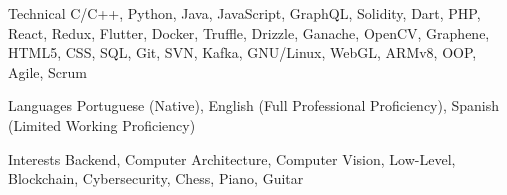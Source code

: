 
\begin{cvskills}
  \cvskill
    {Technical} %
    {C/C++, Python, Java, JavaScript, GraphQL, Solidity, Dart, PHP, React, Redux, Flutter, Docker, Truffle, Drizzle, Ganache, OpenCV, Graphene, HTML5, CSS, SQL, Git, SVN, Kafka, GNU/Linux, WebGL, ARMv8, OOP, Agile, Scrum} %

  \cvskill
    {Languages} %
    {Portuguese (Native), English (Full Professional Proficiency), Spanish (Limited Working Proficiency)} %

  \cvskill
    {Interests} %
    {Backend, Computer Architecture, Computer Vision, Low-Level, Blockchain, Cybersecurity, Chess, Piano, Guitar} %
\end{cvskills}

